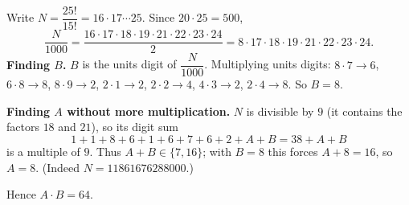 Write $N=\dfrac{25!}{15!}=16\cdot17\cdots25$. Since $20\cdot25=500$,
\[
\dfrac{N}{1000}=\dfrac{16\cdot17\cdot18\cdot19\cdot21\cdot22\cdot23\cdot24}{2}=8\cdot17\cdot18\cdot19\cdot21\cdot22\cdot23\cdot24 .
\]
\textbf{Finding $B$.} $B$ is the units digit of $\dfrac{N}{1000}$. Multiplying units digits: $8\cdot7\to6$, $6\cdot8\to8$, $8\cdot9\to2$, $2\cdot1\to2$, $2\cdot2\to4$, $4\cdot3\to2$, $2\cdot4\to8$. So $B=8$.

\textbf{Finding $A$ without more multiplication.} $N$ is divisible by $9$ (it contains the factors $18$ and $21$), so its digit sum
\[
1+1+8+6+1+6+7+6+2+A+B=38+A+B
\]
is a multiple of $9$. Thus $A+B\in\{7,16\}$; with $B=8$ this forces $A+8=16$, so $A=8$. (Indeed $N=11861676288000$.)

Hence $A\cdot B=\boxed{64}$.
